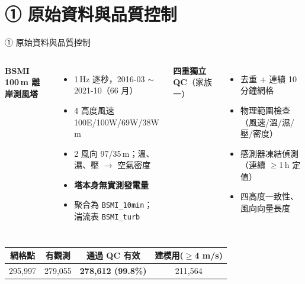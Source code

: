 \documentclass[aspectratio=169,11pt]{beamer}
\newcommand{\best}[1]{\textcolor{accent2}{\textbf{#1}}}
\begin{document}
\section{① 原始資料與品質控制}
\begin{frame}{① 原始資料與品質控制}
  \begin{columns}[T]
    \textbf{BSMI 100\,m 離岸測風塔}
    \begin{itemize}\footnotesize
      \item 1\,Hz 逐秒，2016-03 $\sim$ 2021-10（66 月）
      \item 4 高度風速 100E/100W/69W/38W\,m
      \item 2 風向 97/35\,m；溫、濕、壓 $\to$ 空氣密度
      \item \textbf{塔本身無實測發電量}
      \item 聚合為 \texttt{BSMI\_10min}；湍流表 \texttt{BSMI\_turb}
    \end{itemize}
    \textbf{四重獨立 QC}（家族一）
    \begin{itemize}\footnotesize
      \item 去重 + 連續 10 分鐘網格
      \item 物理範圍檢查（風速/溫/濕/壓/密度）
      \item 感測器凍結偵測（連續 $\ge$1\,h 定值）
      \item 四高度一致性、風向向量長度
    \end{itemize}
  \end{columns}
  \vspace{4pt}
  \centering\footnotesize
  \begin{tabular}{cccc}
    \toprule
    網格點 & 有觀測 & \best{通過 QC 有效} & 建模用($\ge$4 m/s)\\
    \midrule
    295{,}997 & 279{,}055 & \best{278{,}612 (99.8\%)} & 211{,}564\\
    \bottomrule
  \end{tabular}
\end{frame}

\end{document}
